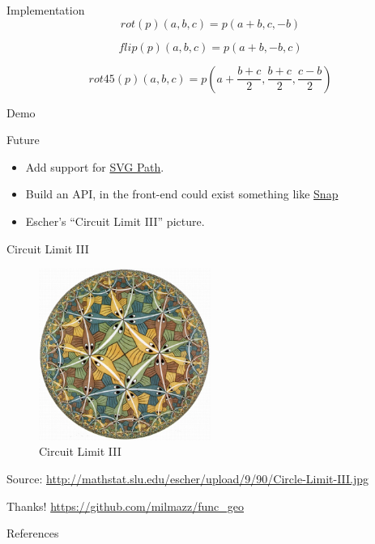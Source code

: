 \documentclass{beamer}
\begin{document}
    \begin{frame}{Implementation}
        \begin{equation*}
        rot(p)(a, b, c) = p(a + b, c, -b)
        \end{equation*}

        \begin{equation*}
        flip(p)(a, b, c) = p(a + b, -b, c)
        \end{equation*}

        \begin{equation*}
        rot45(p)(a, b, c) = p(a + \frac{b + c}{2}, \frac{b + c}{2}, \frac{c - b}{2})
        \end{equation*}
    \end{frame}

    \begin{frame}[standout]
        Demo
    \end{frame}

    \begin{frame}{Future}
        \begin{itemize}
            \item Add support for \href{https://developer.mozilla.org/en/docs/Web/SVG/Tutorial/Paths}{SVG Path}.
            \item Build an API, in the front-end could exist something like \href{http://byob.berkeley.edu/}{Snap}
            \item Escher's ``Circuit Limit III'' picture.
        \end{itemize}

    \end{frame}

    \begin{frame}{Circuit Limit III}
        \begin{figure}
            \centering
            \includegraphics[width=0.5\textwidth]{./figs/Circle-Limit-III}
            \caption{Circuit Limit III}
            \label{fig:circuit_limit_iii}
        \end{figure}
        {\tiny Source: \url{http://mathstat.slu.edu/escher/upload/9/90/Circle-Limit-III.jpg}}
    \end{frame}

    \begin{frame}[standout]
        Thanks!
        \url{https://github.com/milmazz/func\_geo}
    \end{frame}

    \begin{frame}[allowframebreaks]{References}
        
        
    \end{frame}
\end{document}
